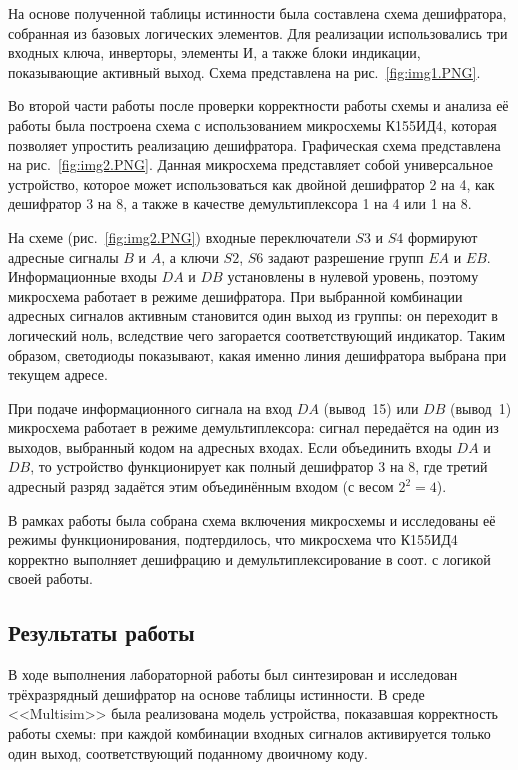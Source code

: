 На основе полученной таблицы истинности была составлена схема дешифратора, собранная из базовых логических элементов. Для реализации использовались три входных ключа, инверторы, элементы И, а также блоки индикации, показывающие активный выход. Схема представлена на рис.~\ref{fig:img1.PNG}.


Во второй части работы после проверки корректности работы схемы и анализа её работы была построена схема с использованием микросхемы К155ИД4, которая позволяет упростить реализацию дешифратора. Графическая схема представлена на рис.~\ref{fig:img2.PNG}. Данная микросхема представляет собой
универсальное устройство, которое может использоваться как двойной
дешифратор 2 на 4, как дешифратор 3 на 8, а также в качестве демультиплексора
1 на 4 или 1 на 8.



На схеме (рис.~\ref{fig:img2.PNG}) входные переключатели $S3$ и $S4$ формируют адресные сигналы $B$ и $A$, а ключи $S2$, $S6$ задают разрешение групп $EA$ и $EB$.  
Информационные входы $DA$ и $DB$ установлены в нулевой уровень, поэтому микросхема работает в режиме дешифратора.  
При выбранной комбинации адресных сигналов активным становится один выход из группы: он переходит в логический ноль, вследствие чего загорается соответствующий индикатор.  
Таким образом, светодиоды показывают, какая именно линия дешифратора выбрана при текущем адресе.  

При подаче информационного сигнала на вход $DA$ (вывод~15) или $DB$
(вывод~1) микросхема работает в режиме демультиплексора: сигнал передаётся
на один из выходов, выбранный кодом на адресных входах. Если объединить
входы $DA$ и $DB$, то устройство функционирует как полный дешифратор 3 на 8,
где третий адресный разряд задаётся этим объединённым входом (с весом $2^2=4$).

В рамках работы была собрана схема включения микросхемы и исследованы
её режимы функционирования, подтердилось, что микросхема что К155ИД4 корректно выполняет дешифрацию и демультиплексирование в соот. с логикой своей работы.

\subsection*{Результаты работы}

В ходе выполнения лабораторной работы был синтезирован и исследован трёхразрядный дешифратор на основе таблицы истинности.  
В среде <<Multisim>> была реализована модель устройства, показавшая корректность работы схемы: при каждой комбинации входных сигналов активируется только один выход, соответствующий поданному двоичному коду.

